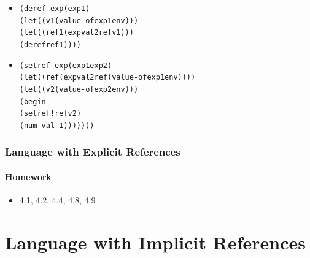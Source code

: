\documentclass{beamer}
\begin{document}
\begin{frame}[fragile]
\begin{tiny}
\begin{itemize}
\item<6->
\begin{alltt}
    (deref-exp (exp1)
               (let ((v1 (value-of exp1 env)))
                 (let ((ref1 (expval2ref v1)))
                   (deref ref1))))
\end{alltt}

\item<7->
\begin{alltt}
    (setref-exp (exp1 exp2)
                (let ((ref (expval2ref (value-of exp1 env))))
                  (let ((v2 (value-of exp2 env)))
                    (begin
                      (setref! ref v2)
                      (num-val -1)))))))
\end{alltt}

\end{itemize}
\end{tiny}
\end{frame}

\begin{frame}[fragile]
\frametitle{Language with Explicit References}
\framesubtitle{Homework}
\begin{scriptsize}
\begin{itemize}
\item<1-> 4.1, 4.2, 4.4, 4.8, 4.9

\end{itemize}
\end{scriptsize}
\end{frame}


\section{Language with Implicit References}
\end{document}
